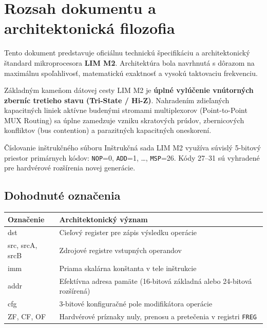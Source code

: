 \documentclass[11pt,a4paper]{article}
\newcommand{\reg}[1]{\texttt{#1}}
\begin{document}
\tableofcontents
\clearpage

\section{Rozsah dokumentu a architektonická filozofia}
Tento dokument predstavuje oficiálnu technickú špecifikáciu a architektonický štandard mikroprocesora \textbf{LIM M2}. 
Architektúra bola navrhnutá s dôrazom na maximálnu spoľahlivosť, matematickú exaktnosť a vysokú taktovaciu frekvenciu.

Základným kameňom dátovej cesty LIM M2 je \textbf{úplné vylúčenie vnútorných zberníc tretieho stavu (Tri-State / Hi-Z)}. Nahradením zdieľaných kapacitných liniek aktívne budenými stromami multiplexorov (Point-to-Point MUX Routing) sa úplne zamedzuje vzniku skratových prúdov, zbernicových konfliktov (bus contention) a parazitných kapacitných oneskorení.

\begin{limnote}{Číslovanie inštrukčného súboru}
Inštrukčná sada LIM M2 využíva súvislý 5-bitový priestor primárnych kódov: 
\texttt{NOP}=0, \texttt{ADD}=1, \ldots, \texttt{MSP}=26. Kódy 27--31 sú vyhradené pre hardvérové rozšírenia novej generácie.
\end{limnote}

\subsection{Dohodnuté označenia}
\begin{tabularx}{\textwidth}{>{\ttfamily}p{28mm}X}
\toprule
Označenie & Architektonický význam \\
\midrule
dst & Cieľový register pre zápis výsledku operácie \\
src, srcA, srcB & Zdrojové registre vstupných operandov \\
imm & Priama skalárna konštanta v tele inštrukcie \\
addr & Efektívna adresa pamäte (16-bitová základná alebo 24-bitová rozšírená) \\
cfg & 3-bitové konfiguračné pole modifikátora operácie \\
ZF, CF, OF & Hardvérové príznaky nuly, prenosu a pretečenia v registri \reg{FREG} \\
\bottomrule
\end{tabularx}
\end{document}

